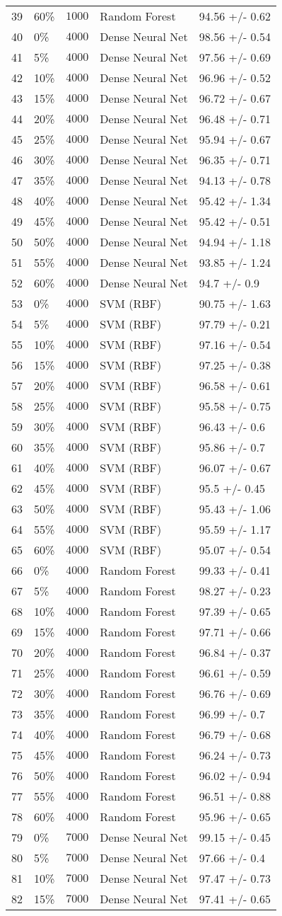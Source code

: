 \begin{table}[!tbp]
\begin{center}
\begin{tabular}{llrll}
39&60\%&$ 1000$&Random Forest&94.56 +/- 0.62\tabularnewline
40&0\%&$ 4000$&Dense Neural Net&98.56 +/- 0.54\tabularnewline
41&5\%&$ 4000$&Dense Neural Net&97.56 +/- 0.69\tabularnewline
42&10\%&$ 4000$&Dense Neural Net&96.96 +/- 0.52\tabularnewline
43&15\%&$ 4000$&Dense Neural Net&96.72 +/- 0.67\tabularnewline
44&20\%&$ 4000$&Dense Neural Net&96.48 +/- 0.71\tabularnewline
45&25\%&$ 4000$&Dense Neural Net&95.94 +/- 0.67\tabularnewline
46&30\%&$ 4000$&Dense Neural Net&96.35 +/- 0.71\tabularnewline
47&35\%&$ 4000$&Dense Neural Net&94.13 +/- 0.78\tabularnewline
48&40\%&$ 4000$&Dense Neural Net&95.42 +/- 1.34\tabularnewline
49&45\%&$ 4000$&Dense Neural Net&95.42 +/- 0.51\tabularnewline
50&50\%&$ 4000$&Dense Neural Net&94.94 +/- 1.18\tabularnewline
51&55\%&$ 4000$&Dense Neural Net&93.85 +/- 1.24\tabularnewline
52&60\%&$ 4000$&Dense Neural Net&94.7 +/- 0.9\tabularnewline
53&0\%&$ 4000$&SVM (RBF)&90.75 +/- 1.63\tabularnewline
54&5\%&$ 4000$&SVM (RBF)&97.79 +/- 0.21\tabularnewline
55&10\%&$ 4000$&SVM (RBF)&97.16 +/- 0.54\tabularnewline
56&15\%&$ 4000$&SVM (RBF)&97.25 +/- 0.38\tabularnewline
57&20\%&$ 4000$&SVM (RBF)&96.58 +/- 0.61\tabularnewline
58&25\%&$ 4000$&SVM (RBF)&95.58 +/- 0.75\tabularnewline
59&30\%&$ 4000$&SVM (RBF)&96.43 +/- 0.6\tabularnewline
60&35\%&$ 4000$&SVM (RBF)&95.86 +/- 0.7\tabularnewline
61&40\%&$ 4000$&SVM (RBF)&96.07 +/- 0.67\tabularnewline
62&45\%&$ 4000$&SVM (RBF)&95.5 +/- 0.45\tabularnewline
63&50\%&$ 4000$&SVM (RBF)&95.43 +/- 1.06\tabularnewline
64&55\%&$ 4000$&SVM (RBF)&95.59 +/- 1.17\tabularnewline
65&60\%&$ 4000$&SVM (RBF)&95.07 +/- 0.54\tabularnewline
66&0\%&$ 4000$&Random Forest&99.33 +/- 0.41\tabularnewline
67&5\%&$ 4000$&Random Forest&98.27 +/- 0.23\tabularnewline
68&10\%&$ 4000$&Random Forest&97.39 +/- 0.65\tabularnewline
69&15\%&$ 4000$&Random Forest&97.71 +/- 0.66\tabularnewline
70&20\%&$ 4000$&Random Forest&96.84 +/- 0.37\tabularnewline
71&25\%&$ 4000$&Random Forest&96.61 +/- 0.59\tabularnewline
72&30\%&$ 4000$&Random Forest&96.76 +/- 0.69\tabularnewline
73&35\%&$ 4000$&Random Forest&96.99 +/- 0.7\tabularnewline
74&40\%&$ 4000$&Random Forest&96.79 +/- 0.68\tabularnewline
75&45\%&$ 4000$&Random Forest&96.24 +/- 0.73\tabularnewline
76&50\%&$ 4000$&Random Forest&96.02 +/- 0.94\tabularnewline
77&55\%&$ 4000$&Random Forest&96.51 +/- 0.88\tabularnewline
78&60\%&$ 4000$&Random Forest&95.96 +/- 0.65\tabularnewline
79&0\%&$ 7000$&Dense Neural Net&99.15 +/- 0.45\tabularnewline
80&5\%&$ 7000$&Dense Neural Net&97.66 +/- 0.4\tabularnewline
81&10\%&$ 7000$&Dense Neural Net&97.47 +/- 0.73\tabularnewline
82&15\%&$ 7000$&Dense Neural Net&97.41 +/- 0.65\tabularnewline

\end{tabular}
\end{center}
\end{table}
